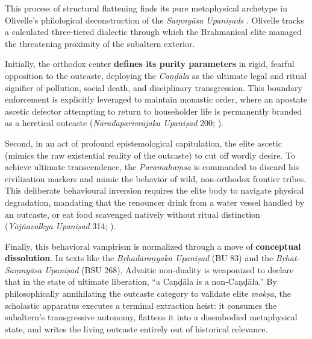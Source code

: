 \documentclass[11pt,twoside,letterpaper]{article}
\begin{document}
This process of structural flattening finds its pure metaphysical archetype in 
Olivelle's philological deconstruction of the \textit{Saṃnyāsa Upaniṣads} \cite{olivelle1992}. Olivelle tracks a calculated three-tiered dialectic through 
which the Brahmanical elite managed the threatening proximity of the subaltern exterior. 

Initially, the orthodox center \textbf{defines its purity parameters} in rigid, fearful opposition to the outcaste, deploying the \textit{Caṇḍāla} as the ultimate legal and ritual signifier of pollution, social death, and disciplinary transgression. This boundary enforcement is explicitly leveraged to maintain monastic order, where an apostate ascetic defector attempting to return to householder life is permanently branded as a heretical outcaste (\textit{Nāradaparivrājaka Upaniṣad} 200; \cite{olivelle1992}).

Second, in an act of profound epistemological capitulation, the elite ascetic (mimics the raw existential reality of the outcaste) to cut off wordly desire. To achieve ultimate transcendence, the \textit{Paramahaṃsa} is commanded to discard his civilization markers and mimic the behavior of wild, non-orthodox frontier tribes. This deliberate behavioural inversion requires the elite body to navigate physical degradation, mandating that the renouncer drink from a water vessel handled by an outcaste, or eat food scavenged natively without ritual distinction (\textit{Yājñavalkya Upaniṣad} 314; \cite{olivelle1992}).

Finally, this behavioral vampirism is normalized through a move of \textbf{conceptual dissolution}. In texts like the \textit{Bṛhadāraṇyaka Upaniṣad} (BU 83) and the \textit{Bṛhat-Saṃnyāsa Upaniṣad} (BSU 268), Advaitic non-duality is weaponized to declare that in the state of ultimate liberation, ``a Caṇḍāla is a non-Caṇḍāla.'' By philosophically annihilating the outcaste category to validate elite \textit{mokṣa}, the scholastic apparatus executes a terminal extraction heist: it consumes the subaltern's transgressive autonomy, flattens it into a disembodied metaphysical state, and writes the living outcaste entirely out of historical relevance.
\end{document}
